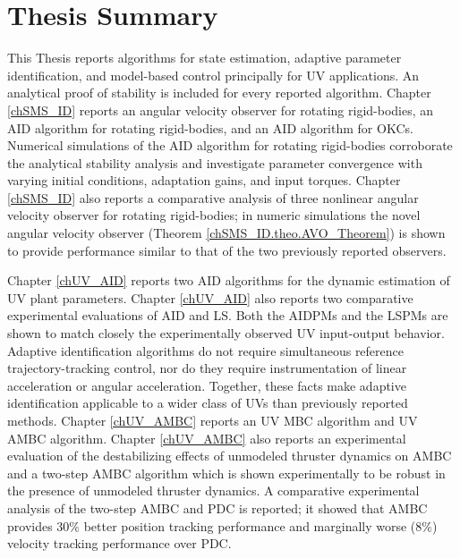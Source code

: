 \section{Thesis Summary}


This Thesis reports algorithms for state estimation, adaptive
parameter identification, and model-based control  principally for
\ac{UV} applications.
%
An analytical proof of stability is included for every reported algorithm.
%
Chapter \ref{chSMS_ID} reports an angular velocity observer for
rotating rigid-bodies, an \ac{AID} algorithm for rotating rigid-bodies,
and an \ac{AID} algorithm for \acp{OKC}.
%
Numerical simulations of the \ac{AID} algorithm for rotating
rigid-bodies corroborate the analytical stability analysis and
investigate parameter convergence with varying initial conditions,
adaptation gains, and input torques.
%
Chapter \ref{chSMS_ID} also reports a comparative analysis of three
nonlinear angular velocity observer for rotating rigid-bodies; in
numeric simulations the novel angular velocity observer (Theorem
\ref{chSMS_ID.theo.AVO_Theorem}) is shown to provide performance
similar to that of the two previously reported observers.


Chapter \ref{chUV_AID} reports two \ac{AID} algorithms for the dynamic
estimation of \ac{UV} plant parameters.
%
Chapter \ref{chUV_AID} also reports two comparative experimental
evaluations of \acl{AID} and \acl{LS}.
%
Both the \acp{AIDPM} and the \acp{LSPM} are shown to match closely the
experimentally observed \ac{UV} input-output behavior.
%
Adaptive identification algorithms do not require simultaneous
reference trajectory-tracking control, nor do they require
instrumentation of linear acceleration or angular acceleration.
%
Together, these facts make adaptive identification applicable to a
wider class of \acp{UV} than previously reported methods.
%
Chapter \ref{chUV_AMBC} reports an \ac{UV} \ac{MBC} algorithm and
\ac{UV} \ac{AMBC} algorithm.  
%
Chapter \ref{chUV_AMBC} also reports an experimental evaluation of the
destabilizing effects of unmodeled thruster dynamics on \ac{AMBC} and a
two-step \ac{AMBC} algorithm which is shown experimentally to be
robust in the presence of unmodeled thruster dynamics.
%
A comparative experimental analysis of the two-step \ac{AMBC} and
\ac{PDC} is reported; it showed that \ac{AMBC} provides 30\% better
position tracking performance and marginally worse (8\%) velocity
tracking performance over \ac{PDC}.
